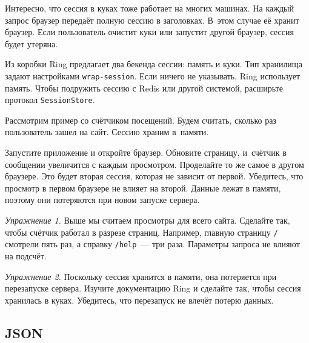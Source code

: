 Интересно, что сессия в куках тоже работает на многих машинах. На каждый запрос
браузер передаёт полную сессию в заголовках. В~этом случае её хранит
браузер. Если пользователь очистит куки или запустит другой браузер, сессия
будет утеряна.

Из коробки Ring предлагает два бекенда сессии: память и куки. Тип хранилища
задают настройками \verb|wrap-session|. Если ничего не указывать, Ring
использует память. Чтобы подружить сессию с Redis или другой системой, расширьте
протокол \verb|SessionStore|.

Рассмотрим пример со счётчиком посещений. Будем считать, сколько раз
пользователь зашел на сайт. Сессию храним в~памяти.


\begin{english}
\end{english}

Запустите приложение и откройте браузер. Обновите страницу, и~счётчик в
сообщении увеличится с каждым просмотром. Проделайте то же самое в другом
браузере. Это будет вторая сессия, которая не зависит от первой. Убедитесь, что
просмотр в первом браузере не влияет на второй. Данные лежат в памяти, поэтому
они потеряются при новом запуске сервера.

\emph{Упражнение 1.} Выше мы считаем просмотры для всего сайта. Сделайте так,
чтобы счётчик работал в разрезе страниц. Например, главную страницу \verb|/|
смотрели пять раз, а справку \verb|/help|~--- три раза. Параметры запроса не
влияют на подсчёт.

\emph{Упражнение 2.} Поскольку сессия хранится в памяти, она потеряется при
перезапуске сервера. Изучите документацию Ring и сделайте так, чтобы сессия
хранилась в куках. Убедитесь, что перезапуск не влечёт потерю данных.

\subsection{JSON}

